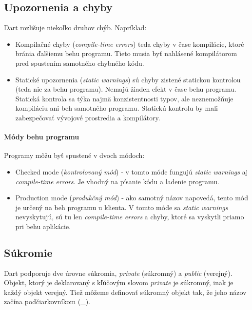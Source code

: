 \subsection{Upozornenia a chyby}%
Dart rozlišuje niekoľko druhov chýb. Napríklad:
\begin{itemize}
\item Kompilačné chyby (\emph{compile-time errors}) teda chyby v čase kompilácie, ktoré bránia ďalšiemu behu programu. Tieto musia byť nahlásené kompilátorom pred spustením samotného chybného kódu.
\item Statické upozornenia (\emph{static warnings}) sú chyby zistené statickou kontrolou (teda nie za behu programu). Nemajú žiaden efekt v čase behu programu.
Statická kontrola sa týka najmä konzistentnosti typov, ale neznemožňuje kompiláciu ani beh samotného programu. Statickú kontrolu by mali zabezpečovať vývojové prostredia a kompilátory.
\end{itemize}

\paragraph{Módy behu programu}
Programy môžu byť spustené v dvoch módoch:%
\begin{itemize}
\item Checked mode (\emph{kontrolovaný mód}) - v tomto móde fungujú \emph{static warnings} aj \emph{compile-time errors}. Je vhodný na písanie kódu a ladenie programu.
\item Production mode (\emph{produkčný mód}) - ako samotný názov napovedá, tento mód je určený na beh programu u klienta. V tomto móde sa \emph{static warnings} nevyskytujú, sú tu len \emph{compile-time errors} a chyby, ktoré sa vyskytli priamo pri behu aplikácie.
\end{itemize}

\subsection{Súkromie}
Dart podporuje dve úrovne súkromia, \emph{private} (súkromný) a \emph{public} (verejný).
Objekt, ktorý je deklarovaný s kľúčovým slovom \emph{private} je súkromný, inak je každý objekt verejný. 
Tiež môžeme definovať súkromný objekt tak, že jeho názov začína podčiarkovníkom (\glqq\_\grqq). 

